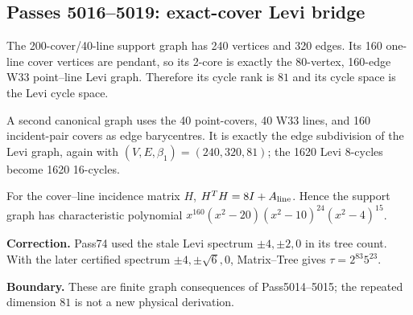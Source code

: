 \subsection*{Passes 5016--5019: exact-cover Levi bridge}
The 200-cover/40-line support graph has 240 vertices and 320 edges.  Its 160 one-line cover vertices are pendant, so its 2-core is exactly the 80-vertex, 160-edge W33 point--line Levi graph.  Therefore its cycle rank is $81$ and its cycle space is the Levi cycle space.

A second canonical graph uses the 40 point-covers, 40 W33 lines, and 160 incident-pair covers as edge barycentres.  It is exactly the edge subdivision of the Levi graph, again with $(V,E,\beta_1)=(240,320,81)$; the 1620 Levi 8-cycles become 1620 16-cycles.

For the cover--line incidence matrix $H$, $H^TH=8I+A_{\rm line}$.  Hence the support graph has characteristic polynomial $x^{160}(x^2-20)(x^2-10)^{24}(x^2-4)^{15}$.

\textbf{Correction.}  Pass74 used the stale Levi spectrum $\pm4,\pm2,0$ in its tree count.  With the later certified spectrum $\pm4,\pm\sqrt6,0$, Matrix--Tree gives $\tau=2^{83}5^{23}$.

\textbf{Boundary.} These are finite graph consequences of Pass5014--5015; the repeated dimension $81$ is not a new physical derivation.
